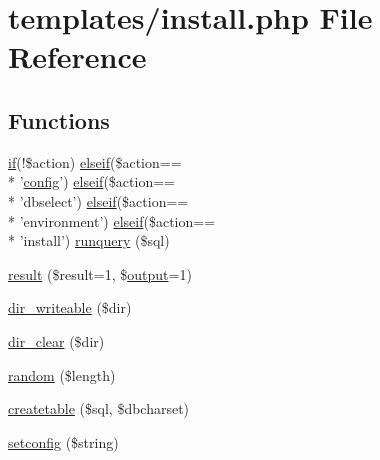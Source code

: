 \hypertarget{templates_2install_8php}{\section{templates/install.php File Reference}
\label{templates_2install_8php}
}
\subsection*{Functions}
\begin{DoxyCompactItemize}
\item 
\hyperlink{login__old_8php_a4ac1118c2e44c513a674bc1793ba6c90}{if}(!\$action) \hyperlink{urlist_8php_a77f52b43f81ed05a41b68c2161789055}{elseif}(\$action== \\*
'\hyperlink{global_8func_8php_a239de3ed26da8daceb8acacdcb03325d}{config}') \hyperlink{urlist_8php_a77f52b43f81ed05a41b68c2161789055}{elseif}(\$action== \\*
'dbselect') \hyperlink{urlist_8php_a77f52b43f81ed05a41b68c2161789055}{elseif}(\$action== \\*
'environment') \hyperlink{urlist_8php_a77f52b43f81ed05a41b68c2161789055}{elseif}(\$action== \\*
'install') \hyperlink{templates_2install_8php_aad7d53b35a4a2d6e7993c1e1ba7c27ee}{runquery} (\$sql)
\item 
\hyperlink{templates_2install_8php_abdecde238169a1e34f68354fc9968af0}{result} (\$result=1, \$\hyperlink{global_8func_8php_aacaca1dd81eba78d1d4363ca06608961}{output}=1)
\item 
\hyperlink{templates_2install_8php_a0963b1f5ef087570e5993ee12ae535e0}{dir\+\_\+writeable} (\$dir)
\item 
\hyperlink{templates_2install_8php_afe48521b311213a1f840bbecaa10324f}{dir\+\_\+clear} (\$dir)
\item 
\hyperlink{templates_2install_8php_acf9d180aa0d66fc296feea1f05a9ac78}{random} (\$length)
\item 
\hyperlink{templates_2install_8php_a37da93c3858053699c00fff132ed7e28}{createtable} (\$sql, \$dbcharset)
\item 
\hyperlink{templates_2install_8php_a46305e0d4c82055b75d574bb6f45e059}{setconfig} (\$string)
\end{DoxyCompactItemize}
